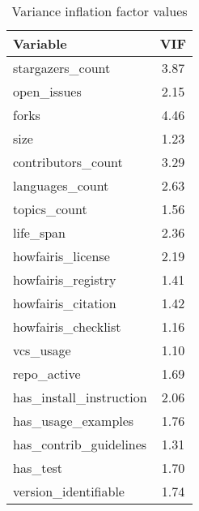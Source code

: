 \begin{table}
\centering
\caption{Variance inflation factor values}
\label{tab:vif}
\begin{tabular}{lc}
\toprule
               Variable &  VIF \\
\midrule
       stargazers\_count & 3.87 \\
            open\_issues & 2.15 \\
                  forks & 4.46 \\
                   size & 1.23 \\
     contributors\_count & 3.29 \\
        languages\_count & 2.63 \\
           topics\_count & 1.56 \\
              life\_span & 2.36 \\
      howfairis\_license & 2.19 \\
     howfairis\_registry & 1.41 \\
     howfairis\_citation & 1.42 \\
    howfairis\_checklist & 1.16 \\
              vcs\_usage & 1.10 \\
            repo\_active & 1.69 \\
has\_install\_instruction & 2.06 \\
     has\_usage\_examples & 1.76 \\
 has\_contrib\_guidelines & 1.31 \\
               has\_test & 1.70 \\
   version\_identifiable & 1.74 \\
\bottomrule
\end{tabular}
\end{table}
